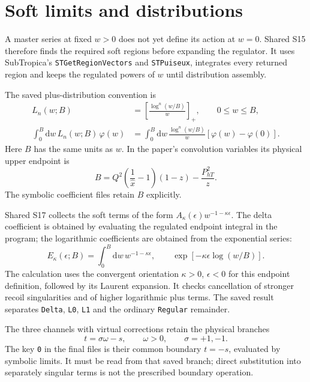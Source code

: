 \documentclass[11pt,a4paper]{article}
\newcommand{\dd}{\mathrm{d}}
\newcommand{\eps}{\epsilon}
\begin{document}
\section{Soft limits and distributions}
\label{sec:soft}

A master series at fixed $w>0$ does not yet define its action at $w=0$.
Shared S15 therefore finds the required soft regions before expanding the
regulator. It uses SubTropica's \texttt{STGetRegionVectors} and
\texttt{STPuiseux}, integrates every returned region and keeps the regulated
powers of $w$ until distribution assembly.

The saved plus-distribution convention is
\begin{align}
 L_n(w;B)&=\left[\frac{\log^n(w/B)}{w}\right]_+,
 \qquad 0\leq w\leq B,\label{eq:plus}\\
 \int_0^B\dd w\,L_n(w;B)\,\varphi(w)
 &=\int_0^B\dd w\,\frac{\log^n(w/B)}{w}
       [\varphi(w)-\varphi(0)].
\end{align}
Here $B$ has the same units as $w$. In the paper's convolution variables
its physical upper endpoint is
\begin{equation}
 B=Q^2\left(\frac{1}{\hat x}-1\right)(1-z)
       -\frac{P_{hT}^2}{z}.
\end{equation}
The symbolic coefficient files retain $B$ explicitly.

Shared S17 collects the soft terms of the form
$A_\kappa(\eps)w^{-1-\kappa\eps}$.
The delta coefficient is obtained by evaluating the regulated endpoint
integral in the program; the logarithmic coefficients are obtained from
the exponential series:
\begin{equation}
 E_\kappa(\eps;B)=\int_0^B\dd w\,w^{-1-\kappa\eps},
 \qquad
 \exp[-\kappa\eps\log(w/B)].
 \label{eq:endpoint}
\end{equation}
The calculation uses the convergent orientation $\kappa>0$, $\eps<0$
for this endpoint definition, followed by its Laurent expansion.
It checks cancellation of stronger recoil singularities and of higher
logarithmic plus terms. The saved result separates \texttt{Delta},
\texttt{L0}, \texttt{L1} and the ordinary \texttt{Regular} remainder.

The three channels with virtual corrections retain the physical branches
\begin{equation}
 t=\sigma\omega-s,\qquad \omega>0,\qquad \sigma=+1,-1.
\end{equation}
The key \texttt{0} in the final files is their common boundary $t=-s$,
evaluated by symbolic limits. It must be read from that saved branch;
direct substitution into separately singular terms is not the prescribed
boundary operation.
\end{document}

